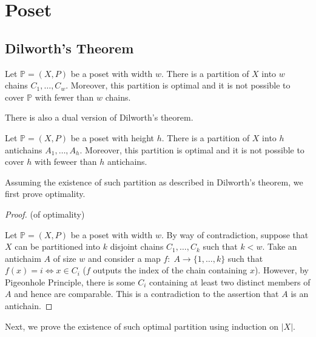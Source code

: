



\section{Poset}

\subsection{Dilworth's Theorem}

\begin{theorem}
    Let $\mathbb{P} = (X,P)$ be a poset with width $w$. There is a partition of $X$ into $w$ chains $C_1,\ldots,C_w$. Moreover, this partition is optimal and it is not possible to cover $\mathbb{P}$ with fewer than $w$ chains.
\end{theorem}

There is also a dual version of Dilworth's theorem.

\begin{theorem}
    Let $\mathbb{P} = (X,P)$ be a poset with height $h$. There is a partition of $X$ into $h$ antichains $A_1,\ldots,A_h$. Moreover, this partition is optimal and it is not possible to cover $h$ with feweer than $h$ antichains.
\end{theorem}

Assuming the existence of such partition as described in Dilworth's theorem, we first prove optimality.

\begin{proof} (of optimality)
    \hfill

    Let $\mathbb{P} = (X,P)$ be a poset with width $w$. By way of contradiction, suppose that $X$ can be partitioned into $k$ disjoint chains $C_1,\ldots, C_k$ such that $k < w$. Take an antichaim $A$ of size $w$ and consider a map $f:\; A \to \{1,\ldots,k\}$ such that $f(x) = i \iff x \in C_i$ ($f$ outputs the index of the chain containing $x$). However, by Pigeonhole Principle, there is some $C_i$ containing at least two distinct members of $A$ and hence are comparable. This is a contradiction to the assertion that $A$ is an antichain.
\end{proof}

Next, we prove the existence of such optimal partition using induction on $|X|$.

